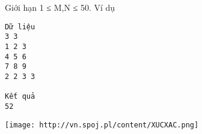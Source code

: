 Giới hạn  
1 ≤ M,N ≤ 50.
   Ví dụ  
\begin{verbatim}
Dữ liệu
3 3
1 2 3
4 5 6
7 8 9
2 2 3 3

Kết quả
52
\end{verbatim}


\texttt{[image: http://vn.spoj.pl/content/XUCXAC.png]}